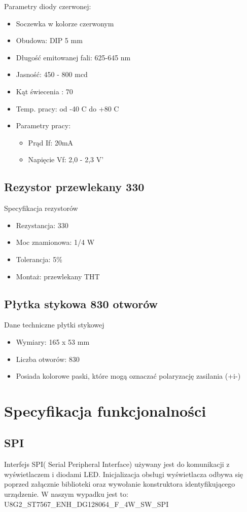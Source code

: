 \documentclass{classrep}
\begin{document}
Parametry diody czerwonej:
\begin{itemize}
  \item Soczewka w kolorze czerwonym
  \item Obudowa: DIP 5 mm
  \item Długość emitowanej fali: 625-645 nm
  \item Jasność: 450 - 800 mcd
  \item Kąt świecenia : 70 \degree
  \item Temp. pracy: od -40 \degree C do +80 \degree C
  \item Parametry pracy:
\begin{itemize}
  \item Prąd If: 20mA
  \item Napięcie Vf: 2,0 - 2,3 V'
\end{itemize}
\end{itemize}

\subsection {Rezystor przewlekany 330 \ohm}
Specyfikacja rezystorów
\begin{itemize}
  \item Rezystancja: 330 \ohm
  \item Moc znamionowa: 1/4 W
  \item Tolerancja: 5\%
  \item Montaż: przewlekany THT
\end{itemize}
\subsection {Płytka stykowa 830 otworów}
Dane techniczne płytki stykowej
\begin{itemize}
  \item Wymiary: 165 x 53 mm
  \item Liczba otworów: 830
  \item Posiada kolorowe paski, które mogą oznaczać polaryzację zasilania (+i-)
\end{itemize}

\section {Specyfikacja funkcjonalności}
\subsection {SPI}
Interfejs SPI( Serial Peripheral Interface) używany jest do komunikacji z wyświetlaczem i diodami LED. Inicjalizacja obsługi wyświetlacza odbywa się poprzed załącznie biblioteki oraz wywołanie konstruktora identyfikującego urządzenie. W naszym wypadku jest to:\\ U8G2\_ST7567\_ENH\_DG128064\_F\_4W\_SW\_SPI\\
\end{document}
